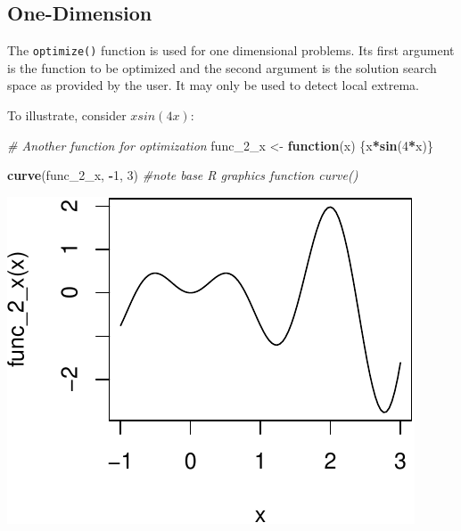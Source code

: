 \documentclass[11pt,]{article}
\newenvironment{Shaded}{\begin{snugshade}}{\end{snugshade}}
\newcommand{\KeywordTok}[1]{\textcolor[rgb]{0.13,0.29,0.53}{\textbf{#1}}}
\newcommand{\DecValTok}[1]{\textcolor[rgb]{0.00,0.00,0.81}{#1}}
\newcommand{\FloatTok}[1]{\textcolor[rgb]{0.00,0.00,0.81}{#1}}
\newcommand{\StringTok}[1]{\textcolor[rgb]{0.31,0.60,0.02}{#1}}
\newcommand{\CommentTok}[1]{\textcolor[rgb]{0.56,0.35,0.01}{\textit{#1}}}
\newcommand{\ControlFlowTok}[1]{\textcolor[rgb]{0.13,0.29,0.53}{\textbf{#1}}}
\newcommand{\OperatorTok}[1]{\textcolor[rgb]{0.81,0.36,0.00}{\textbf{#1}}}
\newcommand{\NormalTok}[1]{#1}
\begin{document}
\subsection{One-Dimension}\label{one-dimension}

The \texttt{optimize()} function is used for one dimensional problems.
Its first argument is the function to be optimized and the second
argument is the solution search space as provided by the user. It may
only be used to detect local extrema.

To illustrate, consider \(xsin(4x)\):

\begin{Shaded}
\begin{Highlighting}[]
\CommentTok{# Another function for optimization}
\NormalTok{func_2_x <-}\StringTok{ }\ControlFlowTok{function}\NormalTok{(x) \{x}\OperatorTok{*}\KeywordTok{sin}\NormalTok{(}\DecValTok{4}\OperatorTok{*}\NormalTok{x)\}}

\KeywordTok{curve}\NormalTok{(func_2_x, }\OperatorTok{-}\DecValTok{1}\NormalTok{, }\DecValTok{3}\NormalTok{) }\CommentTok{#note base R graphics function curve()}
\end{Highlighting}
\end{Shaded}

\begin{center}\includegraphics{Optimization_files/figure-latex/opt_unconstr_optimize-1} \end{center}

\begin{Shaded}
\end{Shaded}
\end{document}
